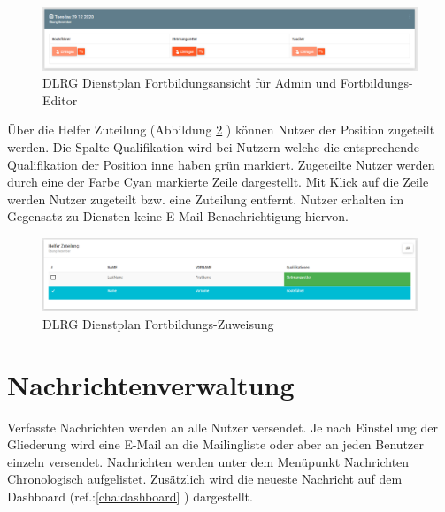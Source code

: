 \begin{figure}[h]
	\begin{addmargin}{-0.2\linewidth}
		\centering 
		\includegraphics[width=20cm]{Bilder/view_training_admin.png}
	\end{addmargin} 
	\caption[Fortbildungen Admin Ansicht]{DLRG Dienstplan Fortbildungsansicht für Admin und Fortbildungs-Editor}
	\label{fig:view_training_admin}
\end{figure}
Über die Helfer Zuteilung (Abbildung \ref{fig:view_training_assign} \textit{}) können Nutzer der Position zugeteilt werden. Die Spalte Qualifikation wird bei Nutzern welche die entsprechende Qualifikation der Position inne haben grün markiert. Zugeteilte Nutzer werden durch eine der Farbe Cyan markierte Zeile dargestellt. Mit Klick auf die Zeile werden Nutzer zugeteilt bzw. eine Zuteilung entfernt. Nutzer erhalten im Gegensatz zu Diensten keine E-Mail-Benachrichtigung hiervon.

\begin{figure}[h]
	\begin{addmargin}{-0.2\linewidth}
		\centering 
		\includegraphics[width=20cm]{Bilder/view_training_assign.png}
	\end{addmargin} 
	\caption[Fortbildungs-Zuweisung]{DLRG Dienstplan Fortbildungs-Zuweisung}
	\label{fig:view_training_assign}
\end{figure}
		
\section{Nachrichtenverwaltung}
\label{sec:admin_news}
Verfasste Nachrichten werden an alle Nutzer versendet. Je nach Einstellung der Gliederung wird eine E-Mail an die Mailingliste oder aber an jeden Benutzer einzeln versendet.
Nachrichten werden unter dem Menüpunkt \glqq Nachrichten\grqq{} Chronologisch aufgelistet. Zusätzlich wird die neueste Nachricht auf dem Dashboard (ref.:\ref{cha:dashboard} ) dargestellt.